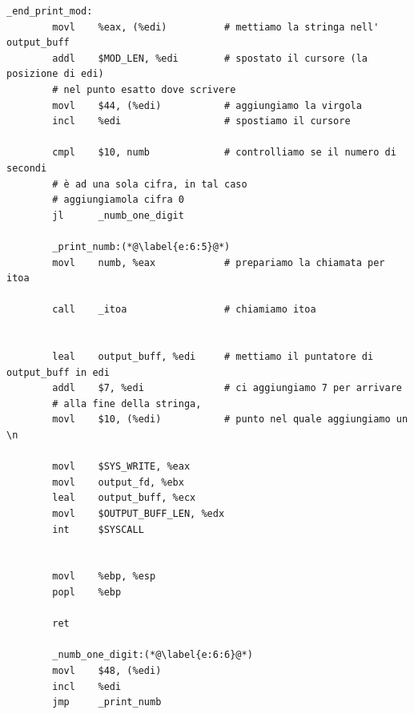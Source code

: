 \documentclass[a4paper,11pt]{article}
\begin{document}
\begin{lstlisting}[language=MyAssembler, style=MyAsm]
		_end_print_mod:
		movl    %eax, (%edi)          # mettiamo la stringa nell' output_buff
		addl    $MOD_LEN, %edi        # spostato il cursore (la posizione di edi)
		# nel punto esatto dove scrivere
		movl    $44, (%edi)           # aggiungiamo la virgola
		incl    %edi                  # spostiamo il cursore
		
		cmpl    $10, numb             # controlliamo se il numero di secondi
		# è ad una sola cifra, in tal caso
		# aggiungiamola cifra 0
		jl      _numb_one_digit
		
		_print_numb:(*@\label{e:6:5}@*)
		movl    numb, %eax            # prepariamo la chiamata per itoa
		
		call    _itoa                 # chiamiamo itoa
		
		
		leal    output_buff, %edi     # mettiamo il puntatore di output_buff in edi
		addl    $7, %edi              # ci aggiungiamo 7 per arrivare
		# alla fine della stringa,
		movl    $10, (%edi)           # punto nel quale aggiungiamo un \n
		
		movl    $SYS_WRITE, %eax
		movl    output_fd, %ebx
		leal    output_buff, %ecx
		movl    $OUTPUT_BUFF_LEN, %edx
		int     $SYSCALL
		
		
		movl    %ebp, %esp
		popl    %ebp
		
		ret
		
		_numb_one_digit:(*@\label{e:6:6}@*)
		movl    $48, (%edi)
		incl    %edi
		jmp     _print_numb
		\end{lstlisting}
		
\end{document}
